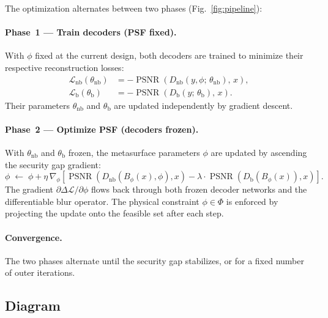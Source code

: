 \documentclass[11pt, a4paper]{article}
\DeclareMathOperator{\PSNR}{PSNR}
\begin{document}
The optimization alternates between two phases (Fig.~\ref{fig:pipeline}):

\paragraph{Phase~1 — Train decoders (PSF fixed).}
With $\phi$ fixed at the current design, both decoders are trained to
minimize their respective reconstruction losses:
\begin{align}
  \mathcal{L}_\text{nb}(\theta_\text{nb}) &=
    -\PSNR\!\left(D_\text{nb}(y,\phi;\,\theta_\text{nb}),\,x\right), \\
  \mathcal{L}_\text{b}(\theta_\text{b}) &=
    -\PSNR\!\left(D_\text{b}(y;\,\theta_\text{b}),\,x\right).
\end{align}
Their parameters $\theta_\text{nb}$ and $\theta_\text{b}$ are updated
independently by gradient descent.

\paragraph{Phase~2 — Optimize PSF (decoders frozen).}
With $\theta_\text{nb}$ and $\theta_\text{b}$ frozen, the metasurface
parameters $\phi$ are updated by ascending the security gap gradient:
\begin{equation}
  \phi \;\leftarrow\; \phi + \eta\,\nabla_\phi
    \left[
      \PSNR\!\left(D_\text{nb}(B_\phi(x),\phi),x\right)
      - \lambda\cdot\PSNR\!\left(D_\text{b}(B_\phi(x)),x\right)
    \right].
\end{equation}
The gradient $\partial\Delta\mathcal{L}/\partial\phi$ flows back through both
frozen decoder networks and the differentiable blur operator.  The physical
constraint $\phi\in\Phi$ is enforced by projecting the update onto the
feasible set after each step.

\paragraph{Convergence.}  The two phases alternate until the security gap
stabilizes, or for a fixed number of outer iterations.

\subsection{Diagram}
\end{document}
